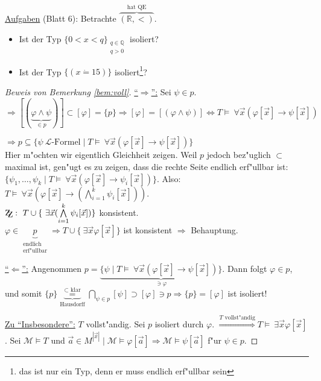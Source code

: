 \documentclass[a4paper,12pt,numbers=noenddot,parskip=full]{scrartcl}
\newcommand{\setQ}{\mathbb{Q}}
\newcommand{\setR}{\mathbb{R}}
\newcommand{\Forall}{~\forall}
\newcommand{\Exists}{~\exists}
\newcommand{\scrL}{\mathcal{L}}
\newcommand{\zz}{\mathrm{Z\kern-.3em\raise-0.5ex\hbox{Z}}:~}
\newcommand{\heading}{\underline}
\theoremstyle{dotless}
\begin{document}
\heading{Aufgaben} (Blatt 6): Betrachte $\overbrace{(\setR, <)}^{\text{hat QE}}$. 
\begin{itemize}
	\item Ist der Typ $\{0 < x < q \}_{\substack{q \in \setQ\\q>0}}$ isoliert?
	\item Ist der Typ $\{(x \dot= 15) \}$ isoliert\footnote{das ist nur ein Typ, denn er muss endlich erf"ullbar sein}?
\end{itemize}
\begin{proof}[Beweis von Bemerkung \ref{bem:voll}]
	\underline{"`$\Rightarrow$"':} Sei $\psi \in p$. $\Longrightarrow [(\underbrace{\varphi \land \psi}_{\in p})] \subset [\varphi] = \{p\} \Longrightarrow [\varphi] = [(\varphi \land \psi)] \Longleftrightarrow T \models \Forall \vec{x} (\varphi[\vec{x}]\rightarrow\psi[\vec{x}])$
	
	$\Longrightarrow p \overset{}{\subseteq} \{\psi~ \scrL \text{-Formel} \mid T\models \Forall \vec{x} (\varphi[\vec{x}]\rightarrow \psi[\vec{x}]) \}$\\
	Hier m"ochten wir eigentlich Gleichheit zeigen. Weil $p$ jedoch bez"uglich $\subset$ maximal ist, gen"ugt es zu zeigen, dass die rechte Seite endlich erf"ullbar ist: $\{\psi_1, \dots, \psi_k \mid T \models \Forall \vec{x}(\varphi[\vec{x}]\rightarrow \psi_i[\vec{x}]) \}$. Also: $T \models \Forall \vec{x} (\varphi[\vec{x}] \rightarrow (\bigwedge\limits_{i=1}^k \psi_i[\vec{x}]))$.\\ 
	$\zz T \cup \{\Exists \vec{x} (\bigwedge\limits_{i=1}^k \psi_i[\vec{x}]) \}$ konsistent.\\
	$\varphi \in \underbrace{p}_{\substack{\text{endlich}\\\text{erf"ullbar}}} \Longrightarrow T\cup \{ \Exists \vec{x} \varphi[\vec{x}] \}$ ist konsistent $\Longrightarrow$ Behauptung.
	
	\underline{"`$\Leftarrow$"':} Angenommen $p = \underbrace{\{\psi \mid T \models \Forall \vec{x} (\varphi[\vec{x}] \rightarrow \psi[\vec{x}]) \}}_{\ni \varphi}$. Dann folgt $\varphi \in p$, und somit $\{p\} \underbrace{\overset{\subset \text{ klar}}{=}}_{\text{Hausdorff}} \bigcap\limits_{\psi \in p} [\psi] \supset [\varphi] \ni p \Longrightarrow \{p\} = [\varphi]$ ist isoliert!
	
	\underline{Zu "`Insbesondere"':} $T$ vollst"andig. Sei $p$ isoliert durch $\varphi$. $\overset{T \text{ vollst"andig}}{\Longrightarrow} T \models \Exists \vec{x} \varphi[\vec{x}]$. Sei $\mathcal{M} \models T$ und $\vec{a} \in M^{|\vec{x}|} \mid \mathcal{M} \models \varphi[\vec{a}] \Longrightarrow \mathcal{M} \models \psi [\vec{a}]$ f"ur $\psi \in p$.
\end{proof}
\end{document}
